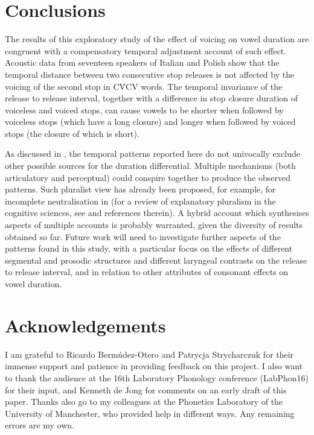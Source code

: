 \documentclass[charis]{glossa}
\begin{document}
\hypertarget{conclusions}{%
\section{Conclusions}\label{conclusions}}

The results of this exploratory study of the effect of voicing on vowel
duration are congruent with a compensatory temporal adjustment account
of such effect. Acoustic data from seventeen speakers of Italian and
Polish show that the temporal distance between two consecutive stop
releases is not affected by the voicing of the second stop in CV́CV
words. The temporal invariance of the release to release interval,
together with a difference in stop closure duration of voiceless and
voiced stops, can cause vowels to be shorter when followed by voiceless
stops (which have a long closure) and longer when followed by voiced
stops (the closure of which is short).

As discussed in , the temporal patterns reported here do
not univocally exclude other possible sources for the duration
differential. Multiple mechanisms (both articulatory and perceptual)
could conspire together to produce the observed patterns. Such pluralist
view has already been proposed, for example, for incomplete
neutralisation in \citealt{winter2011} (for a review of explanatory
pluralism in the cognitive sciences, see \citealt{dale2009} and
references therein). A hybrid account which synthesises aspects of
multiple accounts is probably warranted, given the diversity of results
obtained so far. Future work will need to investigate further aspects of
the patterns found in this study, with a particular focus on the effects
of different segmental and prosodic structures and different laryngeal
contrasts on the release to release interval, and in relation to other
attributes of consonant effects on vowel duration.

\hypertarget{acknowledgements}{%
\section{Acknowledgements}\label{acknowledgements}}

I am grateful to Ricardo Bermúdez-Otero and Patrycja Strycharczuk for
their immense support and patience in providing feedback on this
project. I also want to thank the audience at the 16th Laboratory
Phonology conference (LabPhon16) for their input, and Kenneth de Jong
for comments on an early draft of this paper. Thanks also go to my
colleagues at the Phonetics Laboratory of the University of Manchester,
who provided help in different ways. Any remaining errors are my own.
\end{document}
